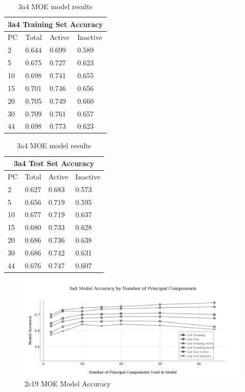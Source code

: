 \begin{table}[!h]
\begin{minipage}{.5\linewidth}
\centering
\begin{tabular}{|l|l|l|l|}
\hline
\multicolumn{4}{|c|}{3a4 Training Set Accuracy} \\ \hline
PC & Total          & Active          & Inactive \\ \hline
2  & 0.644          & 0.699           & 0.589   \\ \hline
5  & 0.675          & 0.727           & 0.623   \\ \hline
10 & 0.698          & 0.741           & 0.655   \\ \hline
15 & 0.701          & 0.746           & 0.656   \\ \hline
20 & 0.705          & 0.749           & 0.660   \\ \hline
30 & 0.709          & 0.761           & 0.657   \\ \hline
44 & 0.698          & 0.773           & 0.623   \\ \hline
\end{tabular}
\end{minipage}
\begin{minipage}{.5\linewidth}
\centering
\begin{tabular}{|l|l|l|l|}
\hline
\multicolumn{4}{|c|}{3a4 Test Set Accuracy}      \\ \hline
PC & Total          & Active          & Inactive \\ \hline
2  & 0.627          & 0.683           & 0.573    \\ \hline
5  & 0.656          & 0.719           & 0.595    \\ \hline
10 & 0.677          & 0.719           & 0.637    \\ \hline
15 & 0.680          & 0.733           & 0.628    \\ \hline
20 & 0.686          & 0.736           & 0.638    \\ \hline
30 & 0.686          & 0.742           & 0.631    \\ \hline
44 & 0.676          & 0.747           & 0.607    \\ \hline
\end{tabular}
\end{minipage}
\caption{3a4 MOE model results}
\end{table}

\begin{figure}[!h]
\includegraphics[width=1\textwidth]{../img/3a4_moe_model_accuracy.png}
\caption{2c19 MOE Model Accuracy}
\end{figure}

